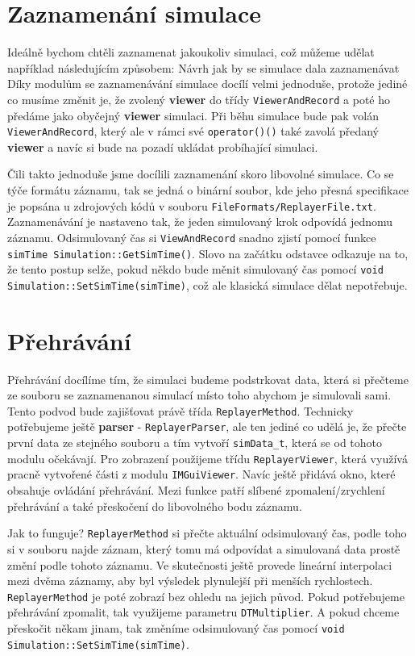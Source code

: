 \section{Zaznamenání simulace}
Ideálně bychom chtěli zaznamenat jakoukoliv simulaci, což můžeme udělat například následujícím způsobem:
{Návrh jak by se simulace dala zaznamenávat}
Díky modulům se zaznamenávání simulace docílí velmi jednoduše, protože jediné co musíme změnit je, že  zvolený \textbf{viewer} do třídy \texttt{ViewerAndRecord} a poté ho předáme jako obyčejný \textbf{viewer} simulaci. Při běhu simulace bude pak volán \texttt{ViewerAndRecord}, který ale v rámci své \texttt{operator()()} také zavolá předaný \textbf{viewer} a navíc si bude na pozadí ukládat probíhající simulaci.

Čili takto jednoduše jsme docílili zaznamenání skoro libovolné simulace.
Co se týče formátu záznamu, tak se jedná o binární soubor, kde jeho přesná specifikace je popsána u zdrojových kódů v souboru \texttt{FileFormats/ReplayerFile.txt}.
Zaznamenávání je nastaveno tak, že jeden simulovaný krok odpovídá jednomu záznamu. Odsimulovaný čas si \texttt{ViewAndRecord} snadno zjistí pomocí funkce \texttt{simTime Simulation::GetSimTime()}.
Slovo  na začátku odstavce odkazuje na to, že tento postup selže, pokud někdo bude měnit simulovaný čas pomocí \texttt{void Simulation::SetSimTime(simTime)}, což ale klasická simulace dělat nepotřebuje.


\section{Přehrávání}
Přehrávání docílíme tím, že simulaci budeme podstrkovat data, která si přečteme ze souboru se zaznamenanou simulací místo toho abychom je simulovali sami. Tento podvod bude zajišťovat právě třída \texttt{ReplayerMethod}. Technicky potřebujeme ještě \textbf{parser} - \texttt{ReplayerParser}, ale ten jediné co udělá je, že přečte první data ze stejného souboru a tím vytvoří \texttt{simData\_t}, která se od tohoto modulu očekávají. Pro zobrazení použijeme třídu \texttt{ReplayerViewer}, která využívá pracně vytvořené části z modulu \texttt{IMGuiViewer}. Navíc ještě přidává okno, které obsahuje ovládání přehrávání. Mezi funkce patří slíbené zpomalení/zrychlení přehrávání a také přeskočení do libovolného bodu záznamu. 

Jak to funguje? \texttt{ReplayerMethod} si přečte aktuální odsimulovaný čas, podle toho si v souboru najde záznam, který tomu má odpovídat a simulovaná data prostě změní podle tohoto záznamu. Ve skutečnosti ještě provede lineární interpolaci mezi dvěma záznamy, aby byl výsledek plynulejší při menších rychlostech. \texttt{ReplayerMethod} je poté zobrazí bez ohledu na jejich původ. Pokud potřebujeme přehrávání zpomalit, tak využijeme parametru \texttt{DTMultiplier}. A pokud chceme přeskočit někam jinam, tak změníme odsimulovaný čas pomocí \texttt{void Simulation::SetSimTime(simTime)}.


